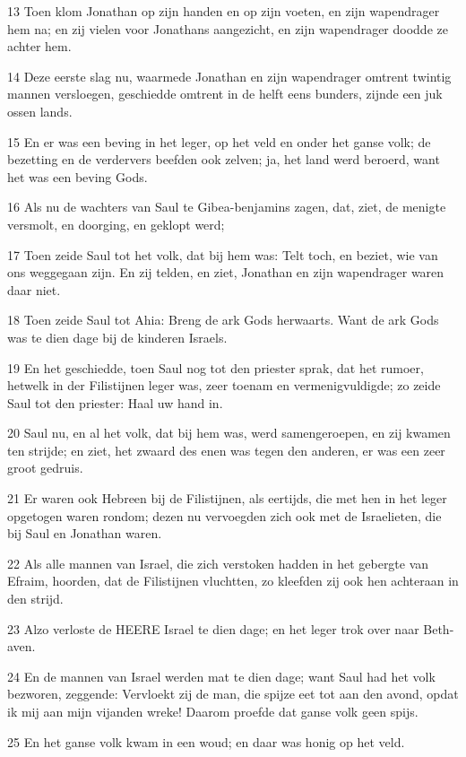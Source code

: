 \par 13 Toen klom Jonathan op zijn handen en op zijn voeten, en zijn wapendrager hem na; en zij vielen voor Jonathans aangezicht, en zijn wapendrager doodde ze achter hem.
\par 14 Deze eerste slag nu, waarmede Jonathan en zijn wapendrager omtrent twintig mannen versloegen, geschiedde omtrent in de helft eens bunders, zijnde een juk ossen lands.
\par 15 En er was een beving in het leger, op het veld en onder het ganse volk; de bezetting en de verdervers beefden ook zelven; ja, het land werd beroerd, want het was een beving Gods.
\par 16 Als nu de wachters van Saul te Gibea-benjamins zagen, dat, ziet, de menigte versmolt, en doorging, en geklopt werd;
\par 17 Toen zeide Saul tot het volk, dat bij hem was: Telt toch, en beziet, wie van ons weggegaan zijn. En zij telden, en ziet, Jonathan en zijn wapendrager waren daar niet.
\par 18 Toen zeide Saul tot Ahia: Breng de ark Gods herwaarts. Want de ark Gods was te dien dage bij de kinderen Israels.
\par 19 En het geschiedde, toen Saul nog tot den priester sprak, dat het rumoer, hetwelk in der Filistijnen leger was, zeer toenam en vermenigvuldigde; zo zeide Saul tot den priester: Haal uw hand in.
\par 20 Saul nu, en al het volk, dat bij hem was, werd samengeroepen, en zij kwamen ten strijde; en ziet, het zwaard des enen was tegen den anderen, er was een zeer groot gedruis.
\par 21 Er waren ook Hebreen bij de Filistijnen, als eertijds, die met hen in het leger opgetogen waren rondom; dezen nu vervoegden zich ook met de Israelieten, die bij Saul en Jonathan waren.
\par 22 Als alle mannen van Israel, die zich verstoken hadden in het gebergte van Efraim, hoorden, dat de Filistijnen vluchtten, zo kleefden zij ook hen achteraan in den strijd.
\par 23 Alzo verloste de HEERE Israel te dien dage; en het leger trok over naar Beth-aven.
\par 24 En de mannen van Israel werden mat te dien dage; want Saul had het volk bezworen, zeggende: Vervloekt zij de man, die spijze eet tot aan den avond, opdat ik mij aan mijn vijanden wreke! Daarom proefde dat ganse volk geen spijs.
\par 25 En het ganse volk kwam in een woud; en daar was honig op het veld.

